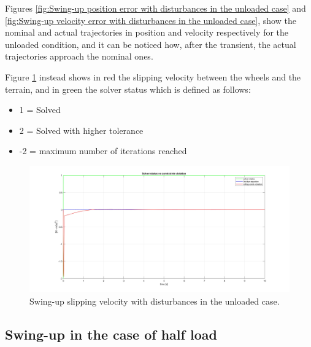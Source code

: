 Figures \ref{fig:Swing-up position error with disturbances in the unloaded case} and \ref{fig:Swing-up velocity error with disturbances in the unloaded case}, show the nominal and actual trajectories in position and velocity respectively for the unloaded condition, and it can be noticed how, after the transient, the actual trajectories approach the nominal ones.

Figure \ref{fig:Swing-up slipping velocity with disturbances in the unloaded case} instead shows in red the slipping velocity between the wheels and the terrain, and in green the solver status which is defined as follows: 

\begin{itemize}
    \item 1 = Solved
    \item 2 = Solved with higher tolerance
    \item -2 = maximum number of iterations reached
\end{itemize}

\begin{figure}
    \centering
    \includegraphics[width=1\linewidth]{Images/Robustness analysis/Unloaded/Swing-Up/Slipping_velocity.jpg}
    \caption{Swing-up slipping velocity with disturbances in the unloaded case.}
    \label{fig:Swing-up slipping velocity with disturbances in the unloaded case}
\end{figure}

\subsection{Swing-up in the case of half load}
\label{subsec:Swing-up in the case of half load}

